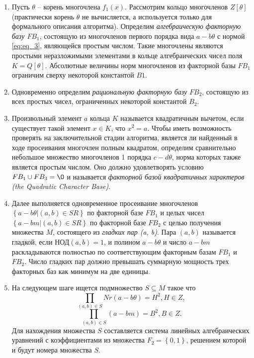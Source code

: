 \documentclass[a4paper,12pt]{article}
\begin{document}
\begin{enumerate}
    \item Пусть $\theta$ -- корень многочлена $f_1(x)$. Рассмотрим кольцо
    многочленов $Z[\theta]$ (практически корень $\theta$ не вычисляется, а используется только
    для формального описания алгоритма). Определим \textit{алгебраическую факторную базу $FB_1$},
    состоящую из многочленов первого порядка вида $a - b\theta$ с нормой \ref{eq:eq_3},
    являющейся простым числом. Такие многочлены являются простыми неразложимыми элементами
    в кольце алгебраических чисел поля $K = Q[\theta]$. Абсолютные величины норм многочленов
    из факторной базы $FB_1$ ограничим сверху некоторой константой $B1$.

    \item Одновременно определим \textit{рациональную факторную базу} $FB_2$,
    состоящую из всех простых чисел, ограниченных некоторой константой $B_2$.

    \item Произвольный элемент $a$ кольца $K$ называется квадратичным вычетом,
    если существует такой элемент $x \in K$, что $x^2 = a$. Чтобы иметь возможность
    проверять на заключительной стадии алгоритма, является ли найденный в ходе просеивания
    многочлен полным квадратом, определим сравнительно небольшое множество многочленов
    1 порядка $c - d\theta$, норма которых также является простым числом.
    Оно должно удовлетворять условию $FB_1 \cup FB_3 = \O$ и называется \textit{факторной
    базой квадратичных характеров (the Quadratic Character Base)}.

    \item Далее выполняется одновременное просеивание многочленов
    $ \left \{a - b\theta | (a, b) \in SR \right \}$ по факторной
    базе $FB_1$ и целых чисел
    $ \left \{a - bm | (a, b) \in SR \right \}$ по факторной базе $FB_2$
    с целью получения множества $M$, состоящего из \textit{гладких пар (a, b)}.
    Пара $(a, b)$ называется гладкой, если НОД$(a, b) = 1$, и полином $a - b\theta$
    и число $a - bm$ раскладываются полностью по соответствующим факторным базам
    $FB_1$ и $FB_2$. Число гладких пар должно превышать суммарную мощность
    трех факторных баз как минимум на две единицы.

    \item На следующем шаге ищется подмножество $S \subseteq M$ такое что
    $$\prod_{(a, b) \in S}Nr(a - b\theta) = H^2, H \in Z,$$
    $$\prod_{(a, b) \in S}(a - bm) = B^2, B \in Z.$$
    Для нахождения множества $S$ составляется система линейных алгебраических
    уравнений с коэффициентами из множества $F_2 = \left \{ 0, 1 \right \}$,
    решением которой и будут номера множества $S$.


\end{enumerate}
\end{document}
